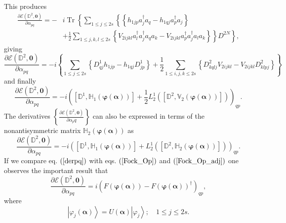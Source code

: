 \documentclass[aps,preprint]{revtex4}%
\begin{document}
This produces%
\begin{align}
\frac{\partial\mathcal{E}\left(  \mathbb{D}^{2},\bm{0}\right)  }%
{\partial\alpha_{pq}}=-  &  i\operatorname{Tr}\left\{  \sum_{1\leq j\leq
2s}\left\{  \left\{  h_{1jp}a_{j}^{\dagger}a_{q}-h_{1qj}a_{p}^{\dagger}%
a_{j}\right\}  \right.  \right. \nonumber\\
&  +\left.  \left.  \frac{1}{2}\sum_{1\leq j,k,l\leq2s}\left\{  V_{2ijkl}%
a_{l}^{\dagger}a_{j}^{\dagger}a_{q}a_{k}-V_{2ijkl}a_{p}^{\dagger}%
a_{j}^{\dagger}a_{l}a_{k}\right\}  \right\}  D^{2N}\right\}  ,
\end{align}
giving%
\begin{equation}
\frac{\partial\mathcal{E}\left(  \mathbb{D}^{2},\bm{0}\right)  }%
{\partial\alpha_{pq}}=-i\left\{  \sum_{1\leq j\leq2s}\left\{  D_{qj}%
^{1}h_{1jp}-h_{1qj}D_{jp}^{1}\right\}  +\frac{1}{2}\sum_{1\leq i,j,k\leq
2s}\left\{  D_{kqlj}^{2}V_{2ijkl}-V_{2ijkl}D_{klpj}^{2}\right\}  \right\}
\end{equation}
and finally
\begin{equation}
\frac{\partial\mathcal{E}\left(  \mathbb{D}^{2},\bm{0}\right)  }%
{\partial\alpha_{pq}}=-i\left(  \left[  \mathbb{D}^{1},\mathbb{H}_{1}\left(
\bm{\varphi}\left(  \bm{\alpha}\right)  \right)  \right]  +\frac{1}{2}%
L_{2}^{1}\left(  \left[  \mathbb{D}^{2},\mathbb{V}_{2}\left(
\bm{\varphi}\left(  \bm{\alpha}\right)  \right)  \right]  \right)  \right)
_{qp}. \label{derpq}%
\end{equation}
The derivatives $\left\{  \frac{\partial\mathcal{E}\left(  \mathbb{D}%
^{2},\bm{0}\right)  }{\partial\alpha_{p}q}\right\}  $ can also be expressed in
terms of the nonantisymmetric matrix $\mathbb{H}_{2}\left(
\bm{\varphi}\left(  \bm{\alpha}\right)  \right)  $ as
\begin{equation}
\frac{\partial\mathcal{E}\left(  \mathbb{D}^{2},\bm{0}\right)  }%
{\partial\alpha_{pq}}=-i\left(  \left[  \mathbb{D}^{1},\mathbb{H}_{1}\left(
\bm{\varphi}\left(  \bm{\alpha}\right)  \right)  \right]  +L_{2}^{1}\left(
\left[  \mathbb{D}^{2},\mathbb{H}_{2}\left(  \bm{\varphi }\left(
\bm{\alpha}\right)  \right)  \right]  \right)  \right)  _{qp}. \label{derpq1}%
\end{equation}
If we compare eq. $\left(  \ref{derpq}\right)  $ with eqs. $\left(
\ref{Fock_Op}\right)  $ and $\left(  \ref{Fock_Op_adj}\right)  $ one observes
the important result that
\begin{equation}
\frac{\partial\mathcal{E}\left(  \mathbb{D}^{2},\bm{0}\right)  }%
{\partial\alpha_{pq}}=i\left(  F\left(  \bm{\varphi}\left(
\bm{\alpha }\right)  \right)  -F\left(  \bm{\varphi}\left(
\bm{\alpha}\right)  \right)  ^{\dagger}\right)  _{qp},
\end{equation}
where
\begin{equation}
\left\vert \varphi_{j}\left(  \bm{\alpha}\right)  \right\rangle =U\left(
\bm{\alpha}\right)  \left\vert \varphi_{j}\right\rangle ;\quad1\leq j\leq2s.
\end{equation}
\end{document}
